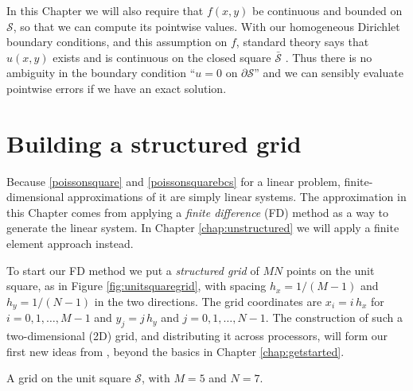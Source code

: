 In this Chapter we will also require that $f(x,y)$ be continuous and bounded on $\mathcal{S}$, so that we can compute its pointwise values.  With our homogeneous Dirichlet boundary conditions, and this assumption on $f$, standard theory says that $u(x,y)$ exists and is continuous on the closed square $\bar{\mathcal{S}}$ \citep[Theorem 6 in section 5.6]{Evans}.  Thus there is no ambiguity in the boundary condition ``$u=0$ on $\partial \mathcal{S}$'' and we can sensibly evaluate pointwise errors if we have an exact solution. 


\section{Building a structured grid}

Because \eqref{poissonsquare} and \eqref{poissonsquarebcs} for a linear problem, finite-dimensional approximations of it are simply linear systems.  The approximation in this Chapter comes from applying a \emph{finite difference} (FD) method as a way to generate the linear system.  In Chapter \ref{chap:unstructured} we will apply a finite element approach instead.

To start our FD method we put a \emph{structured grid} of $MN$ points on the unit square, as in Figure \ref{fig:unitsquaregrid}, with spacing $h_x=1/(M-1)$ and $h_y=1/(N-1)$ in the two directions.  The grid coordinates are $x_i = i\, h_x$ for $i = 0,1,\dots,M-1$ and $y_j = j\, h_y$ and $j=0,1,\dots,N-1$.  The construction of such a two-dimensional (2D) grid, and distributing it across processors, will form our first new ideas from \PETSc, beyond the basics in Chapter \ref{chap:getstarted}.

\begin{marginfigure}
\caption{A grid on the unit square $\mathcal{S}$, with $M=5$ and $N=7$.}
\label{fig:unitsquaregrid}
\end{marginfigure}

